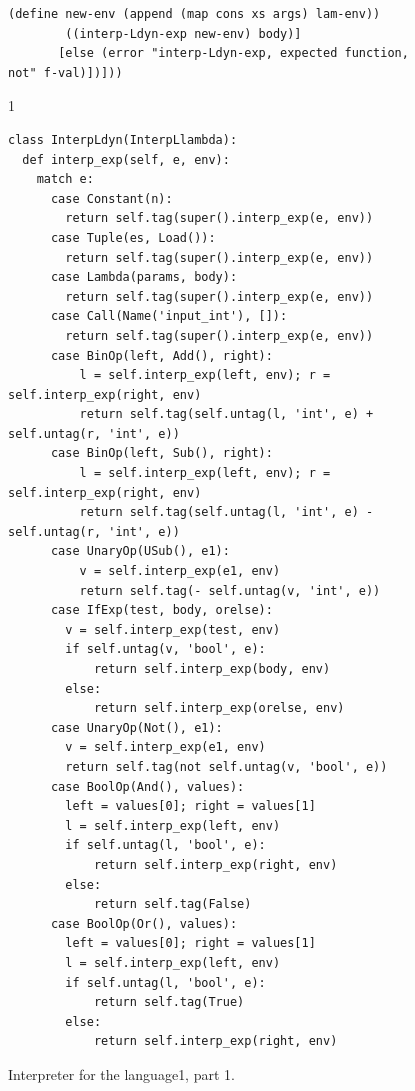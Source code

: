 \documentclass[7x10]{TimesAPriori_MIT}%
\def\pythonEd{1}
\providecommand{\BookEdition}{1}
\let\edition\BookEdition
\newcommand{\pythonColor}[0]{}
\newcommand{\python}[1]{{\if\edition\pythonEd\pythonColor #1\fi}}
\numberwithin{theorem}{chapter}
\numberwithin{definition}{chapter}
\numberwithin{equation}{chapter}
\begin{document}
\begin{figure}[tbp]
\begin{tcolorbox}[colback=white]
{\begin{lstlisting}[basicstyle=\ttfamily\footnotesize]
        (define new-env (append (map cons xs args) lam-env))
        ((interp-Ldyn-exp new-env) body)]
       [else (error "interp-Ldyn-exp, expected function, not" f-val)])]))
\end{lstlisting}
\fi}
{\if\edition\pythonEd\pythonColor
\begin{lstlisting}[basicstyle=\ttfamily\scriptsize]
class InterpLdyn(InterpLlambda):
  def interp_exp(self, e, env):
    match e:
      case Constant(n):
        return self.tag(super().interp_exp(e, env))
      case Tuple(es, Load()):
        return self.tag(super().interp_exp(e, env))
      case Lambda(params, body):
        return self.tag(super().interp_exp(e, env))
      case Call(Name('input_int'), []):
        return self.tag(super().interp_exp(e, env))
      case BinOp(left, Add(), right):
          l = self.interp_exp(left, env); r = self.interp_exp(right, env)
          return self.tag(self.untag(l, 'int', e) + self.untag(r, 'int', e))
      case BinOp(left, Sub(), right):
          l = self.interp_exp(left, env); r = self.interp_exp(right, env)
          return self.tag(self.untag(l, 'int', e) - self.untag(r, 'int', e))
      case UnaryOp(USub(), e1):
          v = self.interp_exp(e1, env)
          return self.tag(- self.untag(v, 'int', e))
      case IfExp(test, body, orelse):
        v = self.interp_exp(test, env)
        if self.untag(v, 'bool', e):
            return self.interp_exp(body, env)
        else:
            return self.interp_exp(orelse, env)
      case UnaryOp(Not(), e1):
        v = self.interp_exp(e1, env)
        return self.tag(not self.untag(v, 'bool', e))
      case BoolOp(And(), values):
        left = values[0]; right = values[1]
        l = self.interp_exp(left, env)
        if self.untag(l, 'bool', e):
            return self.interp_exp(right, env)
        else:
            return self.tag(False)
      case BoolOp(Or(), values):
        left = values[0]; right = values[1]
        l = self.interp_exp(left, env)
        if self.untag(l, 'bool', e):
            return self.tag(True)
        else:
            return self.interp_exp(right, env)
\end{lstlisting}
\fi}
  \end{tcolorbox}

  \caption{Interpreter for the \LangDyn{} language\python{, part 1}.}
\label{fig:interp-Ldyn}
\end{figure}
\end{document}
